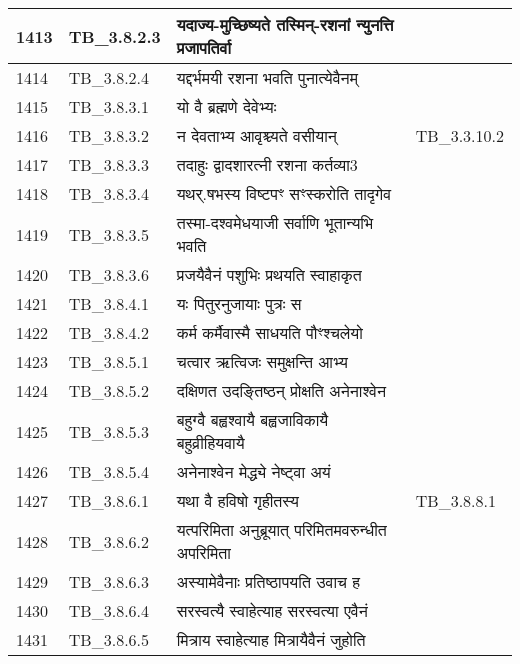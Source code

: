 \documentclass[17pt]{extarticle}
\begin{document}
\begin{longtable}{||p{0.4in}||p{0.9in}||p{4.0in}||p{0.9in}||}
        \hline
            1413 & TB\_3.8.2.3 & यदाज्य{-}मुच्छिष्यते तस्मिन्{-}रशनां न्युनत्ति प्रजापतिर्वा &      \\
        \hline
            1414 & TB\_3.8.2.4 & यद्दर्भमयी रशना भवति पुनात्येवैनम् &      \\
        \hline
            1415 & TB\_3.8.3.1 & यो वै ब्रह्मणे देवेभ्यः &      \\
        \hline
            1416 & TB\_3.8.3.2 & न देवताभ्य आवृश्च्यते वसीयान् & TB\_3.3.10.2        \\
        \hline
            1417 & TB\_3.8.3.3 & तदाहुः द्वादशारत्नी रशना कर्तव्या3 &      \\
        \hline
            1418 & TB\_3.8.3.4 & यथर्.षभस्य विष्टपꣳ सꣳस्करोति तादृगेव &      \\
        \hline
            1419 & TB\_3.8.3.5 & तस्मा{-}दश्वमेधयाजी सर्वाणि भूतान्यभि भवति &      \\
        \hline
            1420 & TB\_3.8.3.6 & प्रजयैवैनं पशुभिः प्रथयति स्वाहाकृत &      \\
        \hline
            1421 & TB\_3.8.4.1 & यः पितुरनुजायाः पुत्रः स &      \\
        \hline
            1422 & TB\_3.8.4.2 & कर्म कर्मैवास्मै साधयति पौꣳश्चलेयो &      \\
        \hline
            1423 & TB\_3.8.5.1 & चत्वार ऋत्विजः समुक्षन्ति आभ्य &      \\
        \hline
            1424 & TB\_3.8.5.2 & दक्षिणत उदङ्तिष्ठन् प्रोक्षति अनेनाश्वेन &      \\
        \hline
            1425 & TB\_3.8.5.3 & बहुग्वै बह्वश्वायै बह्वजाविकायै बहुव्रीहियवायै &      \\
        \hline
            1426 & TB\_3.8.5.4 & अनेनाश्वेन मेद्ध्ये नेष्ट्वा अयं &      \\
        \hline
            1427 & TB\_3.8.6.1 & यथा वै हविषो गृहीतस्य &  TB\_3.8.8.1       \\
        \hline
            1428 & TB\_3.8.6.2 & यत्परिमिता अनुब्रूयात् परिमितमवरुन्धीत अपरिमिता &      \\
        \hline
            1429 & TB\_3.8.6.3 & अस्यामेवैनाः प्रतिष्ठापयति उवाच ह &      \\
        \hline
            1430 & TB\_3.8.6.4 & सरस्वत्यै स्वाहेत्याह सरस्वत्या एवैनं &      \\
        \hline
            1431 & TB\_3.8.6.5 & मित्राय स्वाहेत्याह मित्रायैवैनं जुहोति &      \\
        \hline

\end{longtable}
\end{document}
